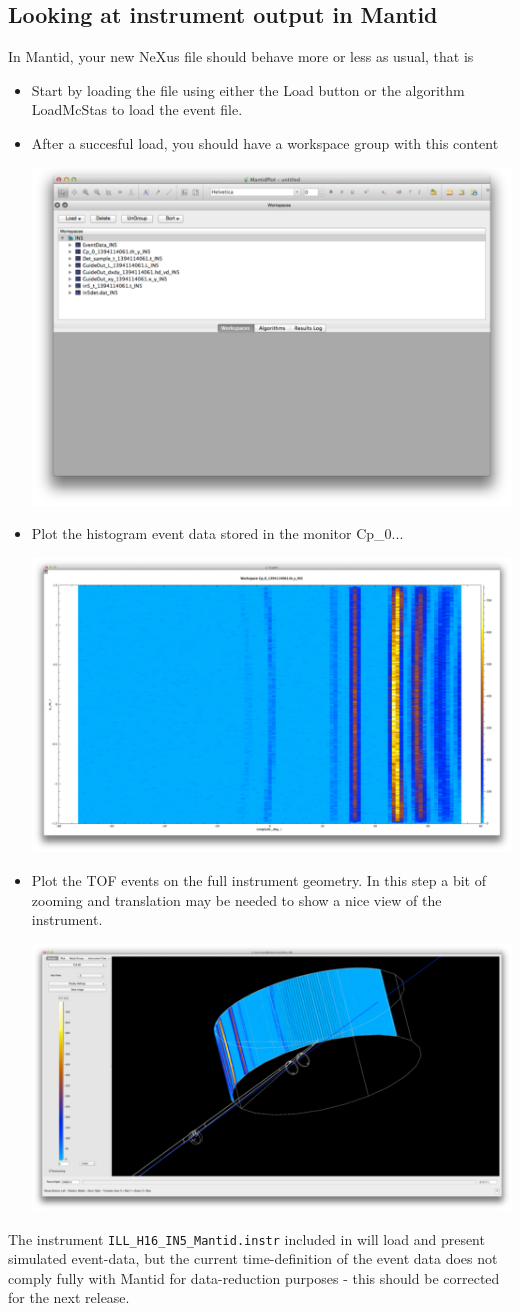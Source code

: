 \subsection{Looking at instrument output in Mantid}
In Mantid, your new NeXus file should behave more or less as usual,
that is
\begin{itemize}
\item Start by loading the file using either the Load button or the
algorithm LoadMcStas to load the event file. 
\item After a succesful load, you should have a workspace group with
this content
\begin{center}\includegraphics[width=.5\textwidth]{figures/mantid-1}\end{center}
\item Plot the histogram event data stored in the monitor Cp\_0...\\
\begin{center}\includegraphics[width=.5\textwidth]{figures/mantid-2}\end{center}
\item Plot the TOF events on the full instrument geometry. In this
step a bit of zooming and translation may be needed to show a nice
view of the instrument.
\begin{center}\includegraphics[width=.5\textwidth]{figures/mantid-3}\end{center}
\end{itemize}
The instrument \verb+ILL_H16_IN5_Mantid.instr+ included in  will load and present
simulated event-data, but the current time-definition of the event data does not comply
fully with Mantid for data-reduction purposes - this should be
corrected for the next \MCS release.

